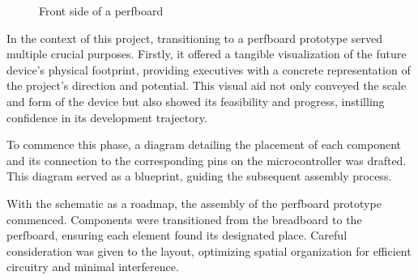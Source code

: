 \begin{figure}[h]
\begin{minipage}[b]{0.45\textwidth}
        \caption{Front side of a perfboard}
        \label{fig:perfboard_front}
    \end{minipage}
\end{figure}

In the context of this project, transitioning to a perfboard prototype served multiple crucial purposes. 
Firstly, it offered a tangible visualization of the future device's physical footprint, providing 
executives with a concrete representation of the project's direction and potential. This visual aid not 
only conveyed the scale and form of the device but also showed its feasibility and progress, instilling 
confidence in its development trajectory.

To commence this phase, a diagram detailing the placement of each component and its connection to the 
corresponding pins on the microcontroller was drafted. This diagram served as a blueprint, guiding the 
subsequent assembly process.

With the schematic as a roadmap, the assembly of the perfboard prototype commenced. Components were 
transitioned from the breadboard to the perfboard, ensuring each element found its designated place. 
Careful consideration was given to the layout, optimizing spatial organization for efficient circuitry 
and minimal interference.

